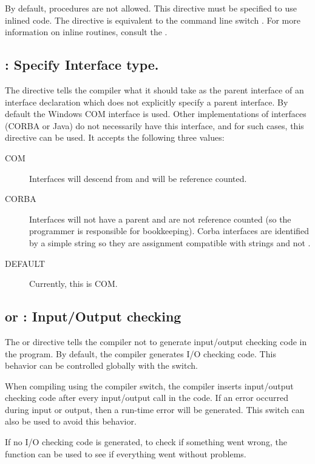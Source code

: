 By default,  procedures are not allowed. This directive must be 
specified to use inlined code. The directive is equivalent to the command line
 switch . For more information on inline routines, consult the .

\subsection{ : Specify Interface type.}
The  directive tells the compiler what it should take
as the parent interface of an interface declaration which does not
explicitly specify a parent interface. By default the Windows COM 
interface is used. Other implementations of interfaces (CORBA or Java) do
not necessarily have this interface, and for such cases, this directive can
be used. It accepts the following three values:
\begin{description}
\item[COM] Interfaces will descend from  and will be reference
counted.
\item[CORBA] Interfaces will not have a parent and are not reference
counted (so the programmer is responsible for bookkeeping). 
Corba interfaces are identified by a simple string so they are assignment compatible 
with strings and not .
\item[DEFAULT] Currently, this is COM.
\end{description}

\subsection{ or  : Input/Output checking}

The  or  directive tells the compiler
not to generate input/output checking code in the program. By default, the
compiler generates I/O checking code. This behavior can be controlled
globally with the  switch.

When compiling using the  compiler switch, the \fpc compiler inserts
input/output checking code after every input/output call in the code.
If an error occurred during input or output, then a run-time error will
be generated. This switch can also be used to avoid this behavior.

If no I/O checking code is generated, to check if something went wrong, 
the  function can be used to see if everything went without 
problems.

